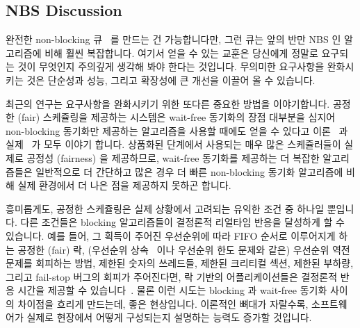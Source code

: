 \subsection{NBS Discussion}
\label{sec:advsync:NBS Discussion}

완전한 non-blocking 큐~\cite{MichaelScott96} 를 만드는 건 가능합니다만, 그런
큐는 앞의 반만 NBS 인 알고리즘에 비해 훨씬 복잡합니다.
여기서 얻을 수 있는 교훈은 당신에게 정말로 요구되는 것이 무엇인지 주의깊게
생각해 봐야 한다는 것입니다.
무의미한 요구사항을 완화시키는 것은 단순성과 성능, 그리고 확장성에 큰 개선을
이끌어 올 수 있습니다.

최근의 연구는 요구사항을 완화시키기 위한 또다른 중요한 방법을 이야기합니다.
공정한 (fair) 스케쥴링을 제공하는 시스템은 wait-free 동기화의 장점 대부분을
심지어 non-blocking 동기화만 제공하는 알고리즘을 사용할 때에도 얻을 수 있다고
이론~\cite{DanAlitarh2013PracticalProgress} 과
실제~\cite{SamyAlBahra2013NBS} 가 모두 이야기 합니다.
상품화된 단계에서 사용되는 매우 많은 스케쥴러들이 실제로 공정성 (fairness) 을
제공하므로, wait-free 동기화를 제공하는 더 복잡한 알고리즘들은 일반적으로 더
간단하고 많은 경우 더 빠른 non-blocking 동기화 알고리즘에 비해 실제 환경에서 더
나은 점을 제공하지 못하곤 합니다.
\iffalse

It is possible to create fully non-blocking queues~\cite{MichaelScott96},
however, such queues are much more complex than the half-NBS algorithm
outlined above.
The lesson here is to carefully consider your actual requirements.
Relaxing irrelevant requirements can often result in great
improvements in simplicity, performance, and scalability.

Recent research points to another important way to relax requirements.
It turns out that systems providing fair scheduling can enjoy most
of the benefits of wait-free synchronization even when running
algorithms that provide only non-blocking
synchronization, both in theory~\cite{DanAlitarh2013PracticalProgress}
and in practice~\cite{SamyAlBahra2013NBS}.
Because a great many schedulers used in production do in fact
provide fairness,
the more-complex algorithms providing wait-free synchronization
usually provide no practical advantages over their simpler
and often faster non-blocking-synchronization counterparts.
\fi

흥미롭게도, 공정한 스케쥴링은 실제 상황에서 고려되는 유익한 조건 중 하나일
뿐입니다.
다른 조건들은 blocking 알고리즘들이 결정론적 리얼타임 반응을 달성하게 할 수
있습니다.
예를 들어, 그 획득이 주어진 우선순위에 따라 FIFO 순서로 이루어지게 하는 공정한
(fair) 락, (우선순위
상속~\cite{Takada:1995:RSN:527074.828566,Cai-DongWang1996PrioInherLock} 이나
우선순위 한도 문제와 같은) 우선순위 역전 문제를 회피하는 방법, 제한된 숫자의
쓰레드들, 제한된 크리티컬 섹션, 제한된 부하량, 그리고 fail-stop 버그의 회피가
주어진다면, 락 기반의 어플리케이션들은 결정론적 반응 시간을 제공할 수
있습니다~\cite{BjoernBrandenburgPhD,DipankarSarma2004OLSscalability}.
물론 이런 시도는 blocking 과 wait-free 동기화 사이의 차이점을 흐리게 만드는데,
좋은 현상입니다.
이론적인 뼈대가 자랄수록, 소프트웨어가 실제로 현장에서 어떻게 구성되는지
설명하는 능력도 증가할 것입니다.
\iffalse

